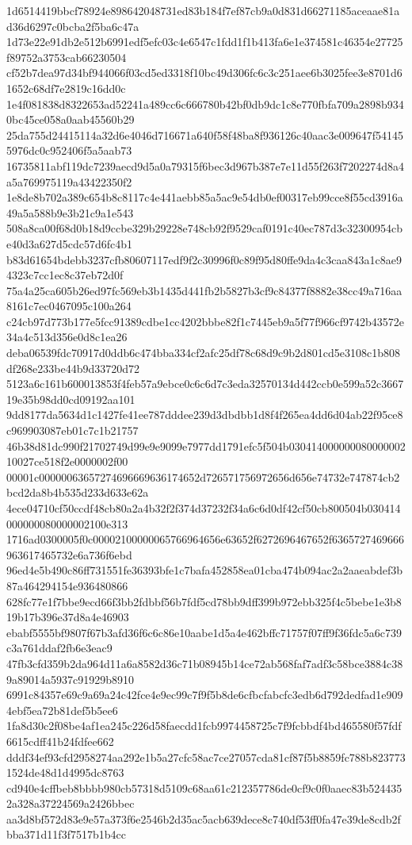 {1d6514419bbcf78924e898642048731ed83b184f7ef87cb9a0d831d66271185aceaae81ad36d6297c0bcba2f5ba6c47a
1d73e22e91db2e512b6991edf5efc03c4e6547c1fdd1f1b413fa6e1e374581c46354e27725f89752a3753cab66230504
cf52b7dea97d34bf944066f03cd5ed3318f10bc49d306fc6c3c251aee6b3025fee3e8701d61652c68df7e2819c16dd0c
1e4f081838d8322653ad52241a489cc6c666780b42bf0db9dc1c8e770fbfa709a2898b9340bc45ce058a0aab45560b29
25da755d24415114a32d6e4046d716671a640f58f48ba8f936126c40aac3e009647f541455976dc0c952406f5a5aab73
16735811abf119dc7239aecd9d5a0a79315f6bec3d967b387e7e11d55f263f7202274d8a4a5a769975119a43422350f2
1e8de8b702a389c654b8c8117c4e441aebb85a5ac9e54db0ef00317eb99cce8f55cd3916a49a5a588b9e3b21c9a1e543
508a8ca00f68d0b18d9ccbe329b29228e748cb92f9529caf0191c40ec787d3c32300954cbe40d3a627d5cdc57d6fc4b1
b83d61654bdebb3237cfb80607117edf9f2c30996f0c89f95d80ffe9da4c3caa843a1c8ae94323c7cc1ec8c37eb72d0f
75a4a25ca605b26ed97fc569eb3b1435d441fb2b5827b3cf9c84377f8882e38cc49a716aa8161c7ec0467095c100a264
c24cb97d773b177e5fcc91389cdbe1cc4202bbbe82f1c7445eb9a5f77f966cf9742b43572e34a4c513d356e0d8c1ea26
deba06539fdc70917d0ddb6c474bba334cf2afc25df78c68d9c9b2d801cd5e3108c1b808df268e233be44b9d33720d72
5123a6c161b600013853f4feb57a9ebce0c6c6d7c3eda32570134d442ccb0e599a52c366719e35b98dd0cd09192aa101
9dd8177da5634d1c1427fe41ee787dddee239d3dbdbb1d8f4f265ea4dd6d04ab22f95ce8c969903087eb01c7c1b21757
46b38d81dc990f21702749d99e9e9099e7977dd1791efc5f504b03041400000008000000210027ce518f2e0000002f00
00001c00000063657274696669636174652d726571756972656d656e74732e747874cb2bcd2da8b4b535d233d633e62a
4ece04710cf50ccdf48cb80a2a4b32f2f374d37232f34a6c6d0df42cf50cb800504b030414000000080000002100e313
1716ad0300005f0c00002100000065766964656e63652f6272696467652f6365727469666963617465732e6a736f6ebd
96ed4e5b490c86ff731551fe36393bfe1c7bafa452858ea01cba474b094ac2a2aaeabdef3b87a464294154e936480866
628fc77e1f7bbe9ecd66f3bb2fdbbf56b7fdf5cd78bb9dff399b972ebb325f4c5bebe1e3b819b17b396e37d8a4e46903
ebabf5555bf9807f67b3afd36f6c6c86e10aabe1d5a4e462bffc71757f07ff9f36fdc5a6c739c3a761ddaf2fb6e3eac9
47fb3cfd359b2da964d11a6a8582d36c71b08945b14ce72ab568faf7adf3c58bce3884c389a89014a5937c91929b8910
6991c84357e69c9a69a24c42fce4e9ec99c7f9f5b8de6cfbcfabcfc3edb6d792dedfad1e9094ebf5ea72b81def5b5ee6
1fa8d30c2f08be4af1ea245c226d58faecdd1fcb9974458725c7f9fcbbdf4bd465580f57fdf6615cdff41b24fdfee662
dddf34ef93cfd2958274aa292e1b5a27cfc58ac7ce27057cda81cf87f5b8859fc788b8237731524de48d1d4995dc8763
cd940e4cffbeb8bbbb980cb57318d5109c68aa61c212357786de0cf9c0f0aaec83b5244352a328a37224569a2426bbec
aa3d8bf572d83e9e57a373f6e2546b2d35ac5acb639dece8c740df53ff0fa47e39de8cdb2fbba371d11f3f7517b1b4cc
}
